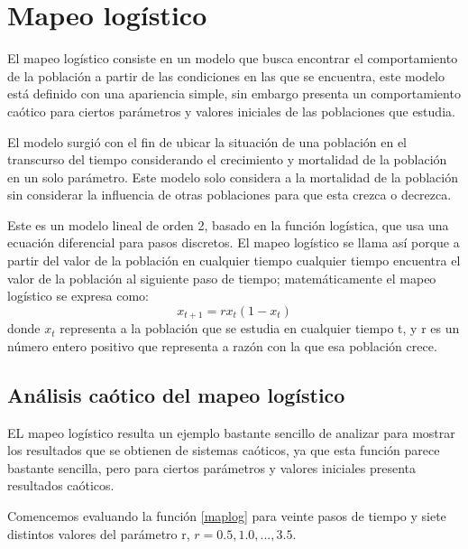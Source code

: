 \section{Mapeo logístico}
\noindent El mapeo logístico consiste en un modelo que busca encontrar el comportamiento de la población a partir de las condiciones en las que se encuentra, este modelo está definido con una apariencia simple, sin embargo presenta un comportamiento caótico para ciertos parámetros y valores iniciales de las poblaciones que estudia.

El modelo surgió con el fin de ubicar la situación de una población en el transcurso del tiempo considerando el crecimiento y mortalidad de la población en un solo parámetro. Este modelo solo considera a la mortalidad de la población sin considerar la influencia de otras poblaciones para que esta crezca o decrezca. 

Este es un modelo lineal de orden 2, basado en la función logística, que usa una ecuación diferencial para pasos discretos. 
El mapeo logístico se llama así porque a partir del valor de la población en cualquier tiempo cualquier tiempo encuentra el valor de la población al siguiente paso de tiempo;
matemáticamente el mapeo logístico se expresa como:
\begin{equation}
x_{t+1}=r x_t \left( 1-x_t \right)
\label{maplog}
\end{equation}
donde $x_t$ representa a la población que se estudia en cualquier tiempo t, y r es un número entero positivo que representa a razón con la que esa población crece.\cite{logmap}

\subsection{Análisis caótico del mapeo logístico}
\noindent EL mapeo logístico resulta un ejemplo bastante sencillo de analizar para mostrar los resultados que se obtienen de sistemas caóticos, ya que esta función parece bastante sencilla, pero para ciertos parámetros y valores iniciales presenta resultados caóticos.

Comencemos evaluando la función \ref{maplog} para veinte pasos de tiempo y siete distintos valores del parámetro r, $r=0.5, 1.0, ... , 3.5$.

